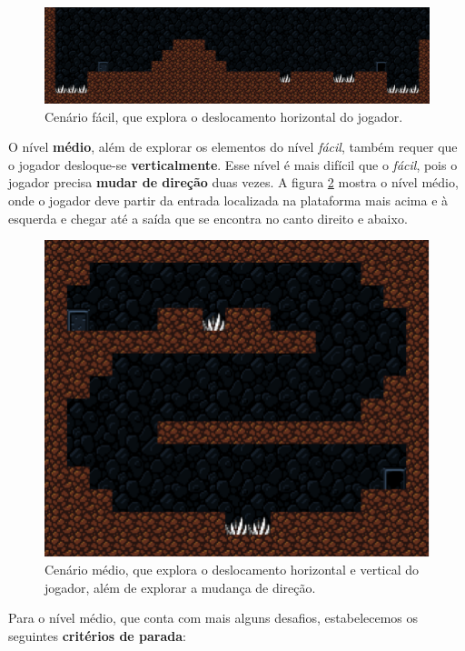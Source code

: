 \begin{figure}[H]
\centering
\includegraphics[width=\textwidth]{fig/levels/level1.pdf}
\caption{Cenário fácil, que explora o deslocamento horizontal do jogador.}
\label{fig:level1}
\end{figure}

O nível \textbf{médio}, além de explorar os elementos do nível \textit{fácil},
também requer que o jogador desloque-se \textbf{verticalmente}. Esse nível é
mais difícil que o \textit{fácil}, pois o jogador precisa \textbf{mudar de
direção} duas vezes. A figura \ref{fig:level2} mostra o nível médio, onde o
jogador deve partir da entrada localizada na plataforma mais acima e à
esquerda e chegar até a saída que se encontra no canto direito e abaixo.

\begin{figure}[H]
\centering
\includegraphics[width=\textwidth / 2]{fig/levels/level2.pdf}
\caption{Cenário médio, que explora o deslocamento horizontal e vertical do
    jogador, além de explorar a mudança de direção.}
\label{fig:level2}
\end{figure}

Para o nível médio, que conta com mais alguns desafios, estabelecemos os
seguintes \textbf{critérios de parada}:

